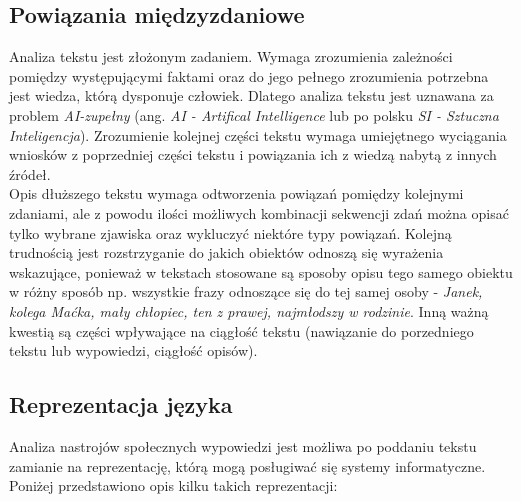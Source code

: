 \subsection{Powiązania międzyzdaniowe}
Analiza tekstu jest złożonym zadaniem. Wymaga zrozumienia zależności pomiędzy występującymi faktami oraz do jego pełnego zrozumienia potrzebna jest wiedza, którą dysponuje człowiek. Dlatego analiza tekstu jest uznawana za problem \textit{AI-zupełny} (ang. \textit{AI - Artifical Intelligence} lub po polsku \textit{SI - Sztuczna Inteligencja}). Zrozumienie kolejnej części tekstu wymaga umiejętnego wyciągania wniosków z poprzedniej części tekstu i powiązania ich z wiedzą nabytą z innych źródeł. \\
Opis dłuższego tekstu wymaga odtworzenia powiązań pomiędzy kolejnymi zdaniami, ale z powodu ilości możliwych kombinacji sekwencji zdań można opisać tylko wybrane zjawiska oraz wykluczyć niektóre typy powiązań. Kolejną trudnością jest rozstrzyganie do jakich obiektów odnoszą się wyrażenia wskazujące, ponieważ w tekstach stosowane są sposoby opisu tego samego obiektu w różny sposób np. wszystkie frazy odnoszące się do tej samej osoby - \textit{Janek, kolega Maćka, mały chłopiec, ten z prawej, najmłodszy w rodzinie}. Inną ważną kwestią są części wpływające na ciągłość tekstu (nawiązanie do porzedniego tekstu lub wypowiedzi, ciągłość opisów).

\subsection{Reprezentacja języka}
Analiza nastrojów społecznych wypowiedzi jest możliwa po poddaniu tekstu zamianie na reprezentację, którą mogą posługiwać się systemy informatyczne. Poniżej przedstawiono opis kilku takich reprezentacji:

